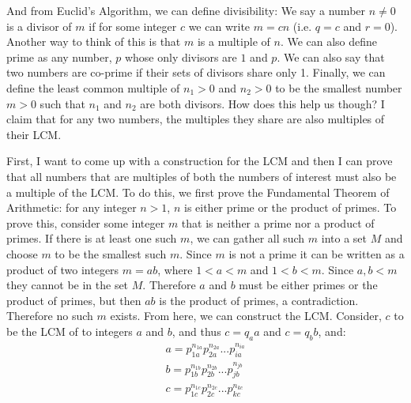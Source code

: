 \documentclass{article}
\begin{document}
And from Euclid's Algorithm, we can define divisibility: We say a number $n \ne 0$ is a divisor of $m$ if for some integer $c$ we can write $m = cn$ (i.e. $q = c$ and $r = 0$). Another way to think of this is that $m$ is a multiple of $n$. We can also define prime as any number, $p$ whose only divisors are $1$ and $p$. We can also say that two numbers are co-prime if their sets of divisors share only 1. Finally, we can define the least common multiple of $n_{1} > 0$ and $n_{2} > 0$ to be the smallest number $m > 0$ such that $n_{1}$ and $n_{2}$ are both divisors. How does this help us though? I claim that for any two numbers, the multiples they share are also multiples of their LCM.

First, I want to come up with a construction for the LCM and then I can prove that all numbers that are multiples of both the numbers of interest must also be a multiple of the LCM. To do this, we first prove the Fundamental Theorem of Arithmetic: for any integer $n > 1$, $n$ is either prime or the product of primes. To prove this, consider some integer $m$ that is neither a prime nor a product of primes. If there is at least one such $m$, we can gather all such $m$ into a set $M$ and choose $m$ to be the smallest such $m$. Since $m$ is not a prime it can be written as a product of two integers $m = ab$, where $1 < a < m$ and $1 < b < m$. Since $a, b < m$ they cannot be in the set $M$. Therefore $a$ and $b$ must be either primes or the product of primes, but then $ab$ is the product of primes, a contradiction. Therefore no such $m$ exists. From here, we can construct the LCM. Consider, $c$ to be the LCM of to integers $a$ and $b$, and thus $c = q_{a}a$ and $c = q_{b}b$, and:
\begin{gather*}
	a = p_{1a}^{n_{1a}}p_{2a}^{n_{2a}}...p_{ia}^{n_{ia}}\\
	b = p_{1b}^{n_{1b}}p_{2b}^{n_{2b}}...p_{jb}^{n_{jb}}\\
	c = p_{1c}^{n_{1c}}p_{2c}^{n_{2c}}...p_{kc}^{n_{kc}}
\end{gather*}
\end{document}
